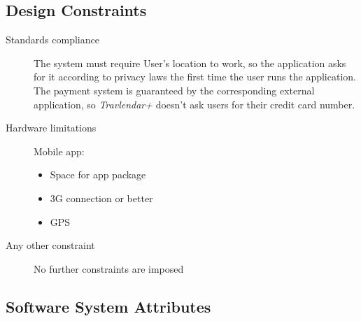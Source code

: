 		
\subsection{Design Constraints}
		\begin{description}
			\item[Standards compliance]
			The system must require User’s location to work, so the application asks for it according to privacy laws the first time the user runs the application.
			The payment system is guaranteed by the corresponding external application, so \textit{Travlendar+} doesn’t ask users for their credit card number.

			\item[Hardware limitations]
			Mobile app:
			\begin{itemize}
			\item Space for app package
			\item 3G connection or better
			\item GPS
		\end{itemize}

			\item[Any other constraint]
			No further constraints are imposed
\end{description}
		
\subsection{Software System Attributes}
	

